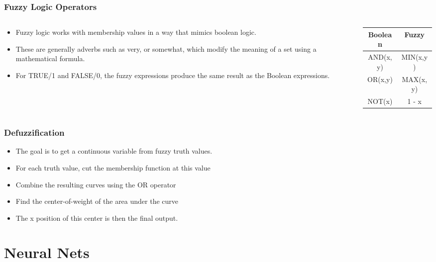 \documentclass{beamer}
\begin{document}
   \begin{frame}
      \frametitle{Fuzzy Logic Operators}
      \begin{columns}[T]
        \begin{column}[T]{5cm}
            \begin{itemize}
               \item Fuzzy logic works with membership values in a way that mimics boolean logic.
               \item These are generally adverbs such as very, or somewhat, which modify the meaning of a set using a mathematical formula.
               \item For TRUE/1 and FALSE/0, the fuzzy expressions produce the same result as the Boolean expressions.
            \end{itemize}
        \end{column}
        \begin{column}[T]{5cm}
            \begin{tabular}{| c | c |}
               \hline
               Boolean & Fuzzy \\
               \hline
               AND(x,y) & MIN(x,y) \\
               OR(x,y)  & MAX(x,y) \\
               NOT(x) & 1 - x \\
               \hline
            \end{tabular}
        \end{column}
      \end{columns}
   \end{frame}

   \begin{frame}
      \frametitle{Defuzzification}
      \begin{itemize}
         \item The goal is to get a continuous variable from fuzzy truth values.
         \item For each truth value, cut the membership function at this value
         \item Combine the resulting curves using the OR operator
         \item Find the center-of-weight of the area under the curve
         \item The x position of this center is then the final output.
      \end{itemize}
   \end{frame}

   \section{Neural Nets}
   
\end{document}
